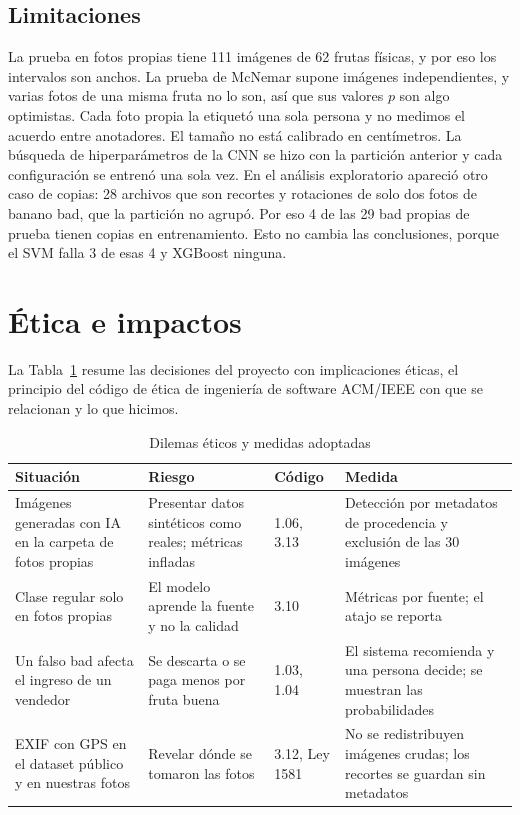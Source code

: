 \documentclass[conference]{IEEEtran}
\begin{document}
\subsection{Limitaciones}
La prueba en fotos propias tiene 111 imágenes de 62 frutas físicas, y por eso los intervalos son anchos. La prueba de McNemar supone imágenes independientes, y varias fotos de una misma fruta no lo son, así que sus valores $p$ son algo optimistas. Cada foto propia la etiquetó una sola persona y no medimos el acuerdo entre anotadores. El tamaño no está calibrado en centímetros. La búsqueda de hiperparámetros de la CNN se hizo con la partición anterior y cada configuración se entrenó una sola vez. En el análisis exploratorio apareció otro caso de copias: 28 archivos que son recortes y rotaciones de solo dos fotos de banano bad, que la partición no agrupó. Por eso 4 de las 29 bad propias de prueba tienen copias en entrenamiento. Esto no cambia las conclusiones, porque el SVM falla 3 de esas 4 y XGBoost ninguna.

\section{Ética e impactos}

La Tabla~\ref{tab:etica} resume las decisiones del proyecto con implicaciones éticas, el principio del código de ética de ingeniería de software ACM/IEEE \cite{acm1999} con que se relacionan y lo que hicimos.

\begin{table}[t]
\caption{Dilemas éticos y medidas adoptadas}
\label{tab:etica}
\centering
\scriptsize
\setlength{\tabcolsep}{3pt}
\begin{tabular}{p{2.0cm}p{2.3cm}p{0.7cm}p{2.6cm}}
\toprule
Situación & Riesgo & Código & Medida \\
\midrule
Imágenes generadas con IA en la carpeta de fotos propias & Presentar datos sintéticos como reales; métricas infladas & 1.06, 3.13 & Detección por metadatos de procedencia y exclusión de las 30 imágenes \\
Clase regular solo en fotos propias & El modelo aprende la fuente y no la calidad & 3.10 & Métricas por fuente; el atajo se reporta \\
Un falso bad afecta el ingreso de un vendedor & Se descarta o se paga menos por fruta buena & 1.03, 1.04 & El sistema recomienda y una persona decide; se muestran las probabilidades \\
EXIF con GPS en el dataset público y en nuestras fotos & Revelar dónde se tomaron las fotos & 3.12, Ley 1581 & No se redistribuyen imágenes crudas; los recortes se guardan sin metadatos \\
\bottomrule
\end{tabular}
\end{table}
\end{document}
